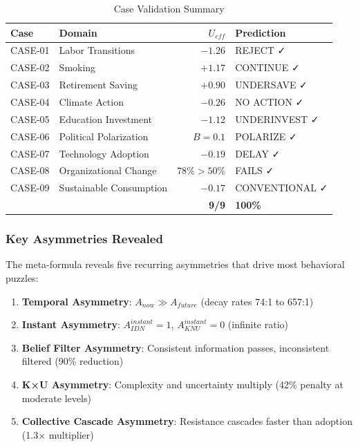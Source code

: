 \begin{table}[htbp]
\centering
\caption{Case Validation Summary}
\label{tab:case-validation-summary}
\begin{tabular}{@{}llrl@{}}
\toprule
\textbf{Case} & \textbf{Domain} & \textbf{$U_{eff}$} & \textbf{Prediction} \\
\midrule
CASE-01 & Labor Transitions & $-1.26$ & REJECT ✓ \\
CASE-02 & Smoking & $+1.17$ & CONTINUE ✓ \\
CASE-03 & Retirement Saving & $+0.90$ & UNDERSAVE ✓ \\
CASE-04 & Climate Action & $-0.26$ & NO ACTION ✓ \\
CASE-05 & Education Investment & $-1.12$ & UNDERINVEST ✓ \\
CASE-06 & Political Polarization & $B=0.1$ & POLARIZE ✓ \\
CASE-07 & Technology Adoption & $-0.19$ & DELAY ✓ \\
CASE-08 & Organizational Change & $78\%>50\%$ & FAILS ✓ \\
CASE-09 & Sustainable Consumption & $-0.17$ & CONVENTIONAL ✓ \\
\midrule
& & \textbf{9/9} & \textbf{100\%} \\
\bottomrule
\end{tabular}
\end{table}

\subsubsection{Key Asymmetries Revealed}

The meta-formula reveals five recurring asymmetries that drive most 
behavioral puzzles:

\begin{enumerate}
    \item \textbf{Temporal Asymmetry}: $A_{now} \gg A_{future}$ 
          (decay rates 74:1 to 657:1)
    
    \item \textbf{Instant Asymmetry}: $A_{IDN}^{instant} = 1$, 
          $A_{KNU}^{instant} = 0$ (infinite ratio)
    
    \item \textbf{Belief Filter Asymmetry}: Consistent information passes, 
          inconsistent filtered (90\% reduction)
    
    \item \textbf{K×U Asymmetry}: Complexity and uncertainty multiply 
          (42\% penalty at moderate levels)
    
    \item \textbf{Collective Cascade Asymmetry}: Resistance cascades faster 
          than adoption (1.3× multiplier)
\end{enumerate}

